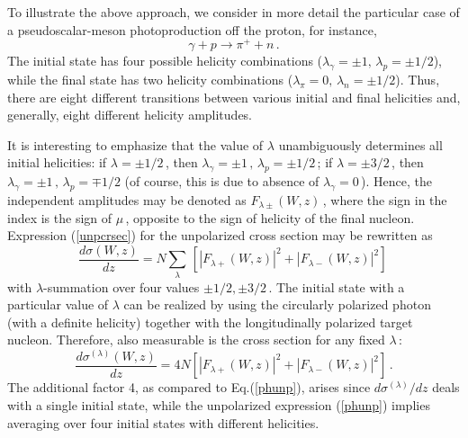 \documentclass[prc,reprint,onecolumn,amsmath,amssymb,superscriptaddress]{revtex4-1}
\newcommand{\be}{\begin{equation}}
\newcommand{\ee}{\end{equation}}
\begin{document}
To illustrate the above approach, we consider in more detail the 
particular case of a pseudoscalar-meson photoproduction off the proton, 
for instance,
\be
	\gamma+p \to \pi^+ +n\,.
	\label{pi}
\ee
The initial state has four possible helicity combinations ($\lambda_\gamma
=\pm1,\,\lambda_p=\pm1/2$), while the final state has two helicity 
combinations ($\lambda_\pi=0,\, \lambda_n=\pm1/2$). Thus, there are eight 
different transitions between various initial and final helicities and, 
generally, eight different helicity amplitudes.

It is interesting to emphasize that the value of $\lambda$ unambiguously 
determines all initial helicities: if $\lambda=\pm1/2\,$, then  
$\lambda_\gamma=\pm1\,,\,\lambda_p=\pm1/2\,$; if $\lambda=\pm3/2\,$, then 
$\lambda_\gamma=\pm1\,,\,\lambda_p=\mp1/2$ (of course, this is due to 
absence of $\lambda_\gamma=0\,$). Hence, the independent amplitudes may 
be denoted as $F_{\lambda\pm}(W,z)\,$, where the sign in the index is the 
sign of $\mu\,$, opposite to the sign of helicity of the final nucleon. 
Expression (\ref{unpcrsec}) for the unpolarized cross section may be 
rewritten as
\be
	\frac{d\sigma(W,z)}{d z}=N\sum_{\lambda}\,\left[|F_{\lambda+}(W,z)|^2
	+|F_{\lambda-}(W,z)|^2\right]\,
	\label{phunp}
\ee
with $\lambda$-summation over four values $\pm1/2,\pm3/2\,$. The initial 
state with a particular value of $\lambda$ can be realized by using the 
circularly polarized photon (with a definite helicity) together with the 
longitudinally polarized target nucleon. Therefore, also measurable is the 
cross section for any fixed $\lambda\,$:
\be
	\frac{d\sigma^{(\lambda)}(W,z)}{d z}=4N\left[|F_{\lambda+}(W,z)|^2
	+|F_{\lambda-}(W,z)|^2\right]\,.
	\label{phlam}
\ee
The additional factor 4, as compared to Eq.(\ref{phunp}), arises since
$d\sigma^{(\lambda)}/d z$ deals with a single initial state, while the
unpolarized expression (\ref{phunp}) implies averaging over four initial 
states with different helicities.
\end{document}
